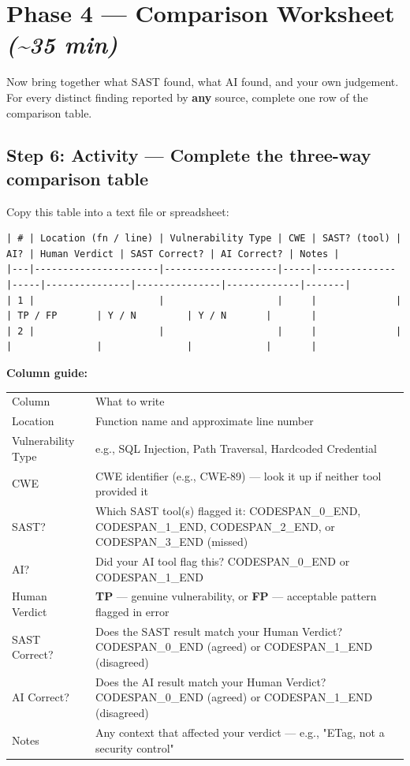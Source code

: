 \documentclass[11pt,a4paper]{book}
\begin{document}
\medskip

\section{Phase 4 --- Comparison Worksheet \textit{(\textasciitilde{}35 min)}}

Now bring together what SAST found, what AI found, and your own judgement. For every distinct finding reported by \textbf{any} source, complete one row of the comparison table.

\subsection{Step 6: Activity --- Complete the three-way comparison table}

Copy this table into a text file or spreadsheet:

\begin{lstlisting}
| # | Location (fn / line) | Vulnerability Type | CWE | SAST? (tool) | AI? | Human Verdict | SAST Correct? | AI Correct? | Notes |
|---|----------------------|--------------------|-----|--------------|-----|---------------|---------------|-------------|-------|
| 1 |                      |                    |     |              |     | TP / FP       | Y / N         | Y / N       |       |
| 2 |                      |                    |     |              |     |               |               |             |       |
\end{lstlisting}

\textbf{Column guide:}

\begin{tabular}{ll}
\hline
Column & What to write \\
Location & Function name and approximate line number \\
Vulnerability Type & e.g., SQL Injection, Path Traversal, Hardcoded Credential \\
CWE & CWE identifier (e.g., CWE-89) --- look it up if neither tool provided it \\
SAST? & Which SAST tool(s) flagged it: CODESPAN\_0\_END, CODESPAN\_1\_END, CODESPAN\_2\_END, or CODESPAN\_3\_END (missed) \\
AI? & Did your AI tool flag this? CODESPAN\_0\_END or CODESPAN\_1\_END \\
Human Verdict & \textbf{TP} --- genuine vulnerability, or \textbf{FP} --- acceptable pattern flagged in error \\
SAST Correct? & Does the SAST result match your Human Verdict? CODESPAN\_0\_END (agreed) or CODESPAN\_1\_END (disagreed) \\
AI Correct? & Does the AI result match your Human Verdict? CODESPAN\_0\_END (agreed) or CODESPAN\_1\_END (disagreed) \\
Notes & Any context that affected your verdict --- e.g., "ETag, not a security control" \\
\hline
\end{tabular}
\end{document}
